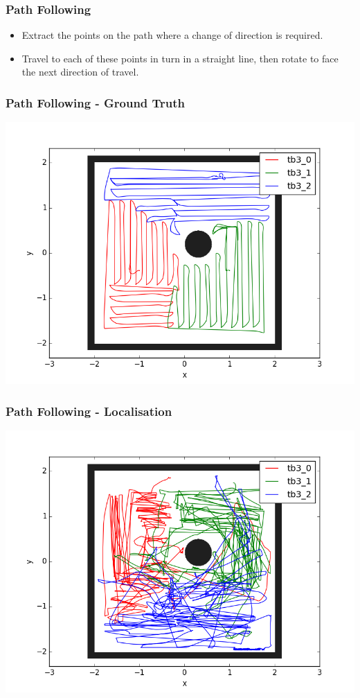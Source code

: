 \documentclass{beamer}
\begin{document}
	\begin{frame}
		\frametitle{Path Following}
		\begin{itemize}
			\item Extract the points on the path where a change of direction is required.
			\item Travel to each of these points in turn in a straight line, then rotate to face the next direction of travel.
		\end{itemize}
	\end{frame}
	\begin{frame}
		\frametitle{Path Following - Ground Truth}
		\centering
		\includegraphics[width=\linewidth]{30min_gt_simple}
	\end{frame}
	\begin{frame}
		\frametitle{Path Following - Localisation}
		\centering
		\includegraphics[width=\linewidth]{30min_loc_simple}
	\end{frame}
	
\end{document}

